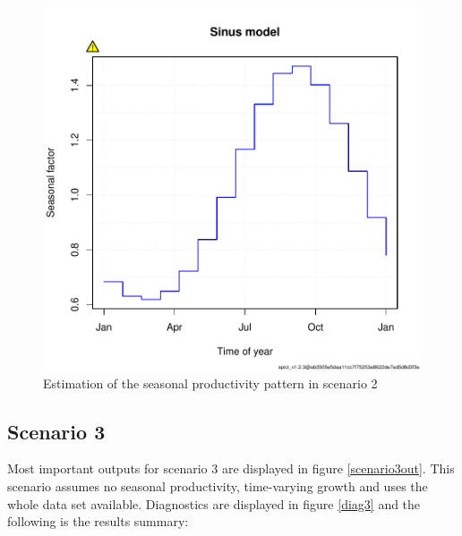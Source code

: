 \documentclass[review]{elsarticle}
\begin{document}

\begin{figure}[h!]
 \centering
 \includegraphics[]{./seaprod.pdf}
 \caption{Estimation of the seasonal productivity pattern in scenario 2}
 \label{seaprod}
\end{figure}




\clearpage

\subsection{Scenario 3}
Most important outputs for scenario 3 are displayed in figure \ref{scenario3out}. This scenario assumes no seasonal productivity, time-varying growth and uses the whole data set available. Diagnostics are displayed in figure \ref{diag3} and the following is the results summary:
\end{document}
